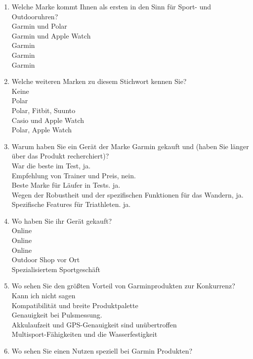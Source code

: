 \begin{enumerate}
    \item Welche Marke kommt Ihnen als ersten in den Sinn für Sport- und Outdooruhren? \\
    Garmin und Polar \\
    Garmin und Apple Watch \\
    Garmin \\
    Garmin \\
    Garmin
    \item Welche weiteren Marken zu diesem Stichwort kennen Sie? \\
    Keine \\
    Polar \\
    Polar, Fitbit, Suunto \\
    Casio und Apple Watch\\
    Polar, Apple Watch
    \item Warum haben Sie ein Gerät der Marke Garmin gekauft und (haben Sie länger über das Produkt recherchiert)? \\
    War die beste im Test, ja. \\
    Empfehlung von Trainer und Preis, nein. \\
    Beste Marke für Läufer in Tests. ja. \\
    Wegen der Robustheit und der spezifischen Funktionen für das Wandern, ja. \\
    Spezifische Features für Triathleten. ja.
    \item Wo haben Sie ihr Gerät gekauft? \\
    Online \\
    Online \\
    Online \\
    Outdoor Shop vor Ort \\
    Spezialisiertem Sportgeschäft
    \item Wo sehen Sie den größten Vorteil von Garminprodukten zur Konkurrenz? \\
    Kann ich nicht sagen \\
    Kompatibilität und breite Produktpalette \\
    Genauigkeit bei Pulsmessung. \\
    Akkulaufzeit und GPS-Genauigkeit sind unübertroffen \\
    Multisport-Fähigkeiten und die Wasserfestigkeit
    \item Wo sehen Sie einen Nutzen speziell bei Garmin Produkten? \\

\end{enumerate}

